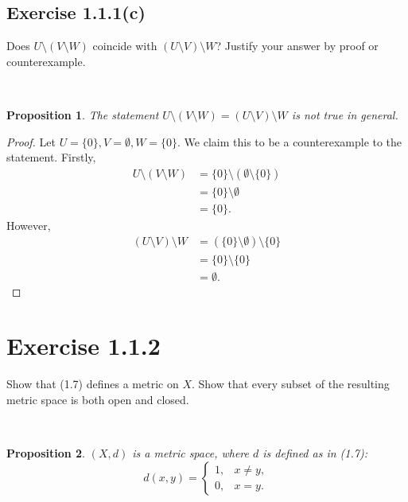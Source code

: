 \documentclass[12pt]{article}
\newenvironment{problem}
    {\begin{lrbox}{\mybox}\begin{minipage}{\textwidth-10pt}}
    {\end{minipage}\end{lrbox}\framebox[6.5in]{\usebox{\mybox}}\\}
\newtheorem{proposition}{Proposition}
\begin{document}
\subsection*{Exercise 1.1.1(c)}
\begin{problem}
    Does $U\setminus(V\setminus W)$ coincide with $(U\setminus V)\setminus W$? Justify your answer by proof or counterexample.
\end{problem}

\begin{proposition}
    The statement $U\setminus(V\setminus W) = (U\setminus V)\setminus W$ is not true in general.
\end{proposition}

\begin{proof}
    Let $U=\{0\}, V=\emptyset, W=\{0\}$. We claim this to be a counterexample to the statement. Firstly,
    \begin{align*}
        U\setminus(V\setminus W)
            &= \{0\}\setminus(\emptyset\setminus\{0\}) \\
            &= \{0\}\setminus\emptyset \\
            &= \{0\}.
    \end{align*}
    However,
    \begin{align*}
        (U\setminus V)\setminus W
            &= (\{0\}\setminus\emptyset)\setminus\{0\} \\
            &= \{0\}\setminus\{0\}  \\
            &= \emptyset.
    \end{align*}
    
\end{proof}

\section*{Exercise 1.1.2}
\begin{problem}
    Show that (1.7) defines a metric on $X$. Show that every subset of the resulting metric space is both open and closed.
\end{problem}
    
\begin{proposition}
    $(X,d)$ is a metric space, where $d$ is defined as in (1.7):
    \[d(x,y) = \begin{cases} 1, &x\ne y, \\ 0, &x=y.\end{cases}\]
\end{proposition}
\end{document}
